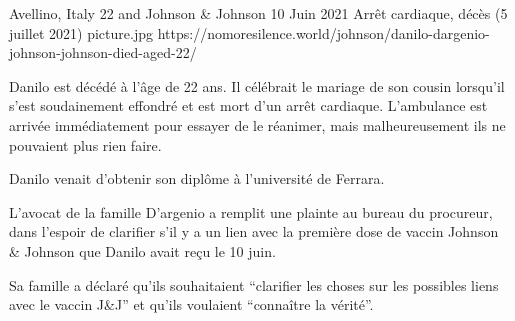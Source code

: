           {Avellino, Italy}
          {22 and}
          {Johnson \& Johnson }
          {10 Juin 2021}
          {Arrêt cardiaque, décès (5 juillet 2021)}
          {picture.jpg}
          {https://nomoresilence.world/johnson/danilo-dargenio-johnson-johnson-died-aged-22/}
          {

Danilo est décédé à l'âge de 22 ans. Il célébrait le mariage de son cousin
lorsqu'il s'est soudainement effondré et est mort d'un arrêt
cardiaque. L'ambulance est arrivée immédiatement pour essayer de le réanimer,
mais malheureusement ils ne pouvaient plus rien faire.

Danilo venait d'obtenir son diplôme à l'université de Ferrara.

L'avocat de la famille D'argenio a remplit une plainte au bureau du procureur,
dans l'espoir de clarifier s'il y a un lien avec la première dose de vaccin
Johnson \& Johnson que Danilo avait reçu le 10 juin.

Sa famille a déclaré qu'ils souhaitaient “clarifier les choses sur les possibles
liens avec le vaccin J\&J” et qu'ils voulaient “connaître la vérité”.

}
